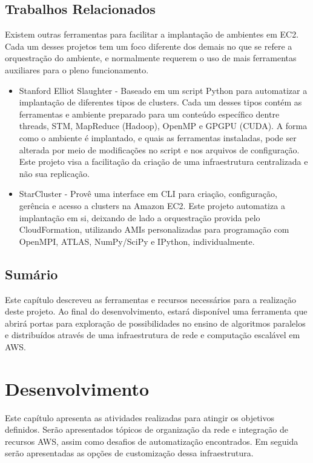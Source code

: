 \documentclass[tg]{mdtufsm}
\begin{document}
\section{Trabalhos Relacionados}

Existem outras ferramentas para facilitar a implantação de ambientes em EC2. Cada um desses projetos tem um foco diferente dos demais no que se refere a orquestração do ambiente, e normalmente requerem o uso de mais ferramentas auxiliares para o pleno funcionamento.

\begin{itemize}
	\item Stanford Elliot Slaughter - Baseado em um script Python para automatizar a implantação de diferentes tipos de clusters. Cada um desses tipos contém as ferramentas e ambiente preparado para um conteúdo específico dentre threads, STM, MapReduce (Hadoop), OpenMP e GPGPU (CUDA). A forma como o ambiente é implantado, e quais as ferramentas instaladas, pode ser alterada por meio de modificações no script e nos arquivos de configuração. Este projeto visa a facilitação da criação de uma infraestrutura centralizada e não sua replicação.
	
	\item StarCluster \cite{starcluster} - Provê uma interface em CLI para criação, configuração, gerência e acesso a clusters na Amazon EC2. Este projeto automatiza a implantação em si, deixando de lado a orquestração provida pelo CloudFormation, utilizando AMIs personalizadas para programação com OpenMPI, ATLAS, NumPy/SciPy e IPython, individualmente.
\end{itemize}

\section{Sumário}

Este capítulo descreveu as ferramentas e recursos necessários para a realização deste projeto. Ao final do desenvolvimento, estará disponível uma ferramenta que abrirá portas para exploração de possibilidades no ensino de algoritmos paralelos e distribuídos através de uma infraestrutura de rede e computação escalável em AWS.

\chapter{Desenvolvimento}

Este capítulo apresenta as atividades realizadas para atingir os objetivos definidos. Serão apresentados tópicos de organização da rede e integração de recursos AWS, assim como desafios de automatização encontrados. Em seguida serão apresentadas as opções de customização dessa infraestrutura.
\end{document}
